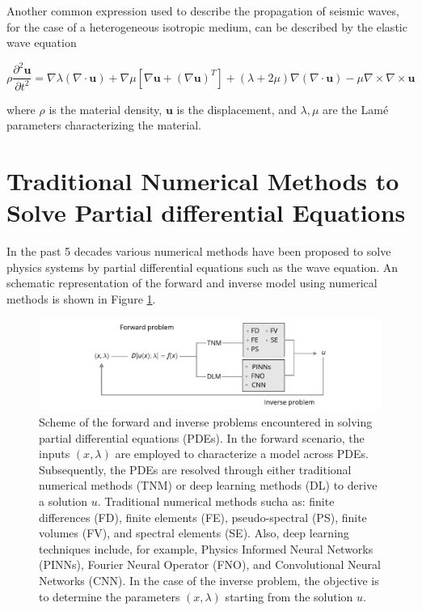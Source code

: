 \documentclass{tufte-handout}
\begin{document}
Another common expression used to describe the propagation of seismic waves, for the case of a heterogeneous isotropic medium, can be described by the elastic wave equation

\begin{equation}
\rho \frac{\partial^2 \boldsymbol{u}}{\partial t^2}=\nabla \lambda(\nabla \cdot \boldsymbol{u})+\nabla \mu\left[\nabla \boldsymbol{u}+(\nabla \boldsymbol{u})^T\right]+(\lambda+2 \mu) \nabla(\nabla \cdot \boldsymbol{u})-\mu \nabla \times \nabla \times \boldsymbol{u}
\label{elastic}
\end{equation}

where $\rho$ is the material density, $\boldsymbol{u}$ is the displacement, and $\lambda, \mu$ are the Lamé parameters characterizing the material. 

\section{Traditional Numerical Methods to Solve Partial differential Equations}\label{sec:tnm}

In the past 5 decades various numerical methods have been proposed to solve physics systems by partial differential equations such as the wave equation. An schematic representation of the forward and inverse model using numerical methods is shown in Figure \ref{fig:forward_inverse}.

\begin{figure}[tb!]
    \includegraphics[scale=1]{figs/forward_inverse_modeling.pdf}
    \caption{Scheme of the forward and inverse problems encountered in solving partial differential equations (PDEs). In the forward scenario, the inputs $(x,\lambda)$ are employed to characterize a model across PDEs. Subsequently, the PDEs are resolved through either traditional numerical methods (TNM) or deep learning methods (DL) to derive a solution $u$. Traditional numerical methods sucha as: finite differences (FD), finite elements (FE), pseudo-spectral (PS), finite volumes (FV), and spectral elements (SE). Also, deep learning techniques include, for example, Physics Informed Neural Networks (PINNs), Fourier Neural Operator (FNO), and Convolutional Neural Networks (CNN). In the case of the inverse problem, the objective is to determine the parameters $(x,\lambda)$ starting from the solution $u$.}
    \label{fig:forward_inverse}
\end{figure}
\end{document}
